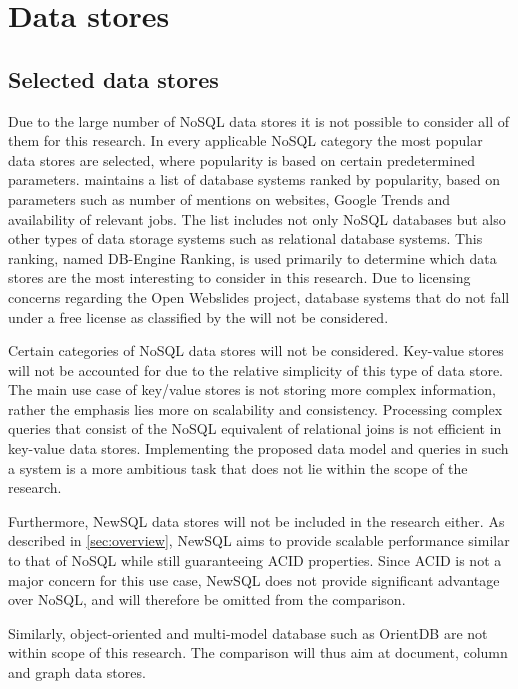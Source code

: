 \section{Data stores}
\label{sec:data-stores}

\subsection{Selected data stores}
\label{sec:selected-data-stores}

Due to the large number of NoSQL data stores it is not possible to consider all of them for this research. In every applicable NoSQL category the most popular data stores are selected, where popularity is based on certain predetermined parameters. \textcite{DBEngine2018} maintains a list of database systems ranked by popularity, based on parameters such as number of mentions on websites, Google Trends and availability of relevant jobs. The list includes not only NoSQL databases but also other types of data storage systems such as relational database systems. This ranking, named DB-Engine Ranking, is used primarily to determine which data stores are the most interesting to consider in this research. Due to licensing concerns regarding the Open Webslides project, database systems that do not fall under a free license as classified by the \textcite{FreeSoftwareFoundation1985} will not be considered.

Certain categories of NoSQL data stores will not be considered. Key-value stores will not be accounted for due to the relative simplicity of this type of data store. The main use case of key/value stores is not storing more complex information, rather the emphasis lies more on scalability and consistency. Processing complex queries that consist of the NoSQL equivalent of relational joins is not efficient in key-value data stores. Implementing the proposed data model and queries in such a system is a more ambitious task that does not lie within the scope of the research.

Furthermore, NewSQL data stores will not be included in the research either. As described in \cref{sec:overview}, NewSQL aims to provide scalable performance similar to that of NoSQL while still guaranteeing ACID properties. Since ACID is not a major concern for this use case, NewSQL does not provide significant advantage over NoSQL, and will therefore be omitted from the comparison.

Similarly, object-oriented and multi-model database such as OrientDB \autocite{OrientDB2010} are not within scope of this research. The comparison will thus aim at document, column and graph data stores.

